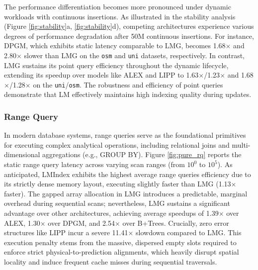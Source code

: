 The performance differentiation becomes more pronounced under dynamic workloads with continuous insertions. As illustrated in the stability analysis (Figure \ref{fig:stability}a, \ref{fig:stability}d), competing architectures experience various degrees of performance degradation after 50M continuous insertions. For instance, DPGM, which exhibits static latency comparable to LMG, becomes 1.68$\times$ and 2.80$\times$ slower than LMG on the \texttt{osm} and \texttt{uni} datasets, respectively. In contrast, LMG sustains its point query efficiency throughout the dynamic lifecycle, extending its speedup over models like ALEX and LIPP to 1.63$\times$/1.23$\times$ and 1.68$\times$/1.28$\times$ on the \texttt{uni}/\texttt{osm}. The robustness and efficiency of point queries demonstrate that LM effectively maintains high indexing quality during updates.

\subsubsection{Range Query}
\label{sec:range_query}
In modern database systems, range queries serve as the foundational primitives for executing complex analytical operations, including relational joins and multi-dimensional aggregations (e.g., GROUP BY). Figure \ref{fig:pure_rq} reports the static range query latency across varying scan ranges (from $10^0$ to $10^5$). As anticipated, LMIndex exhibits the highest average range queries efficiency due to its strictly dense memory layout, executing slightly faster than LMG (1.13$\times$ faster). The gapped array allocation in LMG introduces a predictable, marginal overhead during sequential scans; nevertheless, LMG sustains a significant advantage over other architectures, achieving average speedups of 1.39$\times$ over ALEX, 1.30$\times$ over DPGM, and 2.54$\times$ over B+Trees. Crucially, zero error structures like LIPP incur a severe 11.41$\times$ slowdown compared to LMG. This execution penalty stems from the massive, dispersed empty slots required to enforce strict physical-to-prediction alignments, which heavily disrupt spatial locality and induce frequent cache misses during sequential traversals.

